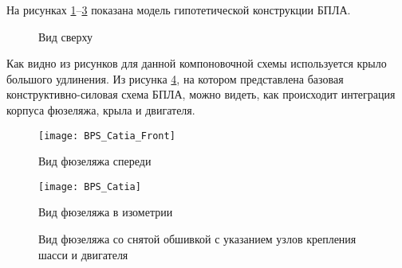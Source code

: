 На рисунках 
\ref{fig:BPS_Catia_Top}--\ref{fig:BPS_Catia} показана модель гипотетической конструкции БПЛА.


\begin{figure}[H]
\centering
\def\svgwidth{0.9\textwidth}

\caption{Вид сверху}
\label{fig:BPS_Catia_Top}
\end{figure}



Как видно из рисунков для данной компоновочной схемы используется крыло большого удлинения. Из рисунка \ref{fig:BPS_Catia_WithoutSkin}, на котором представлена базовая конструктивно-силовая схема БПЛА, можно видеть, как происходит интеграция корпуса фюзеляжа, крыла и двигателя. 

\begin{figure}[H]
\centering
\texttt{[image: BPS\_Catia\_Front]}
\caption{Вид фюзеляжа спереди}
\label{fig:BPS_Catia_Front}
\end{figure}




\begin{figure}[H]
\centering
\texttt{[image: BPS\_Catia]}
\caption{Вид фюзеляжа в изометрии}
\label{fig:BPS_Catia}
\end{figure}


\begin{figure}[H]
\centering
\def\svgwidth{0.9\textwidth}

\caption{Вид фюзеляжа со снятой обшивкой с указанием узлов крепления шасси и двигателя}
\label{fig:BPS_Catia_WithoutSkin}
\end{figure}


